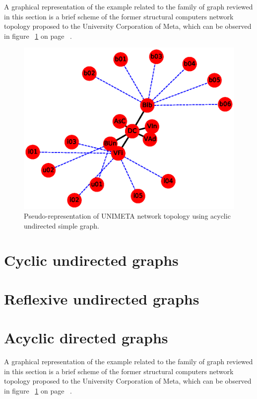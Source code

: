 \documentclass{article}
\begin{document}
A graphical representation of the example related to the family of graph reviewed in this section is a brief scheme of the former structural computers network topology proposed to the University Corporation of Meta, which can be observed in figure ~\ref{fig:AUSG}  on page ~\pageref{fig:AUSG}.\linebreak



\begin{figure}[!ht]
  \includegraphics[width=.8\columnwidth]{images/NF_H1_graph_sect01.eps}
  \caption{Pseudo-representation of UNIMETA network topology using acyclic undirected simple graph.}
  \label{fig:AUSG}
\end{figure}

\section{Cyclic undirected graphs}

\section{Reflexive undirected graphs}

\section{Acyclic directed graphs}

A graphical representation of the example related to the family of graph reviewed in this section is a brief scheme of the former structural computers network topology proposed to the University Corporation of Meta, which can be observed in figure ~\ref{fig:AUSG}  on page ~\pageref{fig:AUSG}.\linebreak
\end{document}
